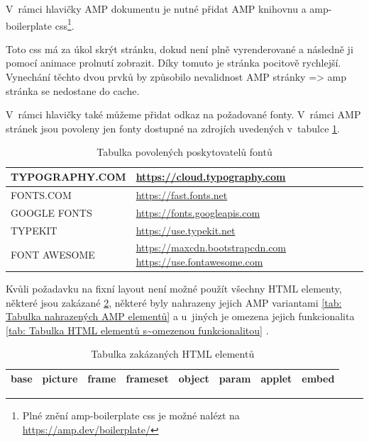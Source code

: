 V~rámci hlavičky AMP dokumentu je nutné přidat AMP knihovnu a amp-boilerplate css\footnote{Plné znění amp-boilerplate css je možné nalézt na \url{https://amp.dev/boilerplate/}}\cite{AMPBoilerplate}.

Toto css má za úkol skrýt stránku, dokud není plně vyrenderované a následně ji pomocí animace prolnutí zobrazit. Díky tomuto je stránka pocitově rychlejší.
Vynechání těchto dvou prvků by způsobilo nevalidnost AMP stránky => amp stránka se nedostane do cache.

V~rámci hlavičky také můžeme přidat odkaz na požadované fonty. V~rámci AMP stránek jsou povoleny jen fonty dostupné na zdrojích uvedených v~tabulce \ref{tab:Tabulka povolených zdrojů fontů}\cite{ampCustomFonts}.

\begin{table}[H]
	\caption{Tabulka povolených poskytovatelů fontů}
	\centering
	\begin{tabular}{m{10em} | m{20em}}
		\toprule
		\cmidrule(r){1-2}
		TYPOGRAPHY.COM & \url{https://cloud.typography.com} \\ \midrule
		FONTS.COM & \url{https://fast.fonts.net} \\ \midrule
		GOOGLE FONTS & \url{https://fonts.googleapis.com} \\ \midrule
		TYPEKIT & \url{https://use.typekit.net} \\ \midrule
		FONT AWESOME & \url{https://maxcdn.bootstrapcdn.com} \newline \url{https://use.fontawesome.com} \\
		\bottomrule
	\end{tabular}
	\label{tab:Tabulka povolených zdrojů fontů}
\end{table}

Kvůli požadavku na fixní layout není možné použít všechny HTML elementy, některé jsou zakázané \ref{tab: Tabulka zakázaných HTML elementů}, některé byly nahrazeny jejich AMP variantami \ref{tab: Tabulka nahrazených AMP elementů} a u~jiných je omezena jejich funkcionalita \ref{tab: Tabulka HTML elementů s~omezenou funkcionalitou} \cite[p.\ 41]{AMP-ENG-Book}.

\begin{table}[H]
	\caption{Tabulka zakázaných HTML elementů} 
	\centering
	\begin{tabular}{c|c|c|c|c|c|c|c}
		\toprule
		base & picture & frame & frameset & object & param & applet & embed \\
		\bottomrule
	\end{tabular}
	\label{tab: Tabulka zakázaných HTML elementů}
\end{table}

